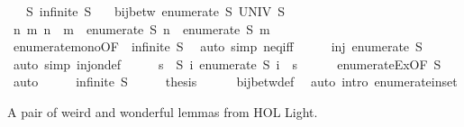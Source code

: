 \begin{isabellebody}
\ \ \ S{\isacharcolon}\ {\isachardoublequoteopen}infinite\ S{\isachardoublequoteclose}\isanewline
\ \ \ {\isachardoublequoteopen}bij{\isacharunderscore}betw\ {\isacharparenleft}enumerate\ S{\isacharparenright}\ UNIV\ S{\isachardoublequoteclose}\isanewline
%
\isadelimproof
%
\endisadelimproof
%
\isatagproof
{}\isamarkupfalse%
\ {\isacharminus}\isanewline
\ \ \isamarkupfalse%
\ {\isachardoublequoteopen}{\isasymAnd}n\ m{\isachardot}\ n\ {\isasymnoteq}\ m\ {\isasymLongrightarrow}\ enumerate\ S\ n\ {\isasymnoteq}\ enumerate\ S\ m{\isachardoublequoteclose}\isanewline
\ \ \ \ \isamarkupfalse%
\ enumerate{\isacharunderscore}mono{\isacharbrackleft}OF\ {\isacharunderscore}\ {\isacartoucheopen}infinite\ S{\isacartoucheclose}{\isacharbrackright}\ \isamarkupfalse%
\ {\isacharparenleft}auto\ simp{\isacharcolon}\ neq{\isacharunderscore}iff{\isacharparenright}\isanewline
\ \ \isamarkupfalse%
\ \isamarkupfalse%
\ {\isachardoublequoteopen}inj\ {\isacharparenleft}enumerate\ S{\isacharparenright}{\isachardoublequoteclose}\isanewline
\ \ \ \ \isamarkupfalse%
\ {\isacharparenleft}auto\ simp{\isacharcolon}\ inj{\isacharunderscore}on{\isacharunderscore}def{\isacharparenright}\isanewline
\ \ \isamarkupfalse%
\ \isamarkupfalse%
\ {\isachardoublequoteopen}{\isasymforall}s\ {\isasymin}\ S{\isachardot}\ {\isasymexists}i{\isachardot}\ enumerate\ S\ i\ {\isacharequal}\ s{\isachardoublequoteclose}\isanewline
\ \ \ \ \isamarkupfalse%
\ enumerate{\isacharunderscore}Ex{\isacharbrackleft}OF\ S{\isacharbrackright}\ \isamarkupfalse%
\ auto\isanewline
\ \ \isamarkupfalse%
\ \isamarkupfalse%
\ {\isacartoucheopen}infinite\ S{\isacartoucheclose}\isanewline
\ \ \isamarkupfalse%
\ \isamarkupfalse%
\ {\isacharquery}thesis\isanewline
\ \ \ \ \isamarkupfalse%
\ bij{\isacharunderscore}betw{\isacharunderscore}def\ \isamarkupfalse%
\ {\isacharparenleft}auto\ intro{\isacharcolon}\ enumerate{\isacharunderscore}in{\isacharunderscore}set{\isacharparenright}\isanewline
{}\isamarkupfalse%
%
\endisatagproof
{\isafoldproof}%
%
\isadelimproof
%
\endisadelimproof
%
\begin{isamarkuptext}%
A pair of weird and wonderful lemmas from HOL Light.%
\end{isamarkuptext}\isamarkuptrue%
\isamarkupfalse%

\end{isabellebody}
